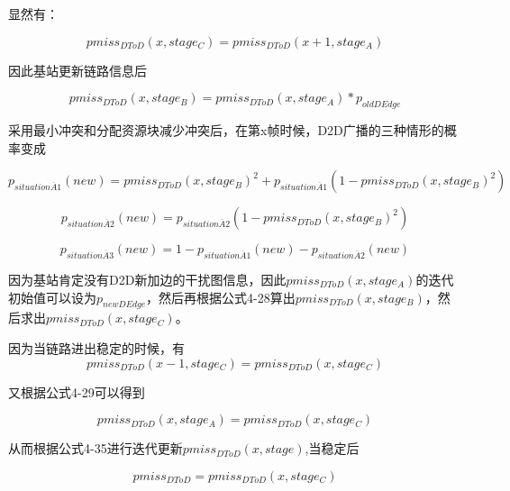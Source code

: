 \documentclass[figurelist,tablelist,algorithmlist,nomlist,masters]{seuthesix}
\begin{document}
	显然有：
	
	\begin{equation}\label{eq3.1}
	pmis{s_{DToD}}(x,stag{e_C}) = pmis{s_{DToD}}(x + 1,stag{e_A})
	\end{equation}
	
	因此基站更新链路信息后
	
	\begin{equation}\label{eq3.2}
	pmis{s_{DToD}}(x,stag{e_B}) = pmis{s_{DToD}}(x,stag{e_A})*{p_{oldDEdge}}
	\end{equation}
	
	采用最小冲突和分配资源块减少冲突后，在第x帧时候，D2D广播的三种情形的概率变成
	
	\begin{equation}\label{eq3.1}
	{p_{situation\overline A 1}}(new) = pmis{s_{DToD}}{(x,stag{e_B})^2} + {p_{situation\overline A 1}}(1 - pmis{s_{DToD}}{(x,stag{e_B})^2})
	\end{equation}
	
	\begin{equation}\label{eq3.1}
	{p_{situation\overline A 2}}(new) = {p_{situation\overline A 2}}(1 - pmis{s_{DToD}}{(x,stag{e_B})^2})
	\end{equation}
	
	\begin{equation}\label{eq3.1}
	{p_{situation\overline A 3}}(new) = 1 - {p_{situation\overline A 1}}(new) - {p_{situation\overline A 2}}(new)
	\end{equation}
	
	因为基站肯定没有D2D新加边的干扰图信息，因此$pmis{s_{DToD}}(x,stag{e_A})$的迭代初始值可以设为${p_{newDEdge}}$，然后再根据公式4-28算出$pmis{s_{DToD}}(x,stag{e_B})$，然后求出$pmis{s_{DToD}}(x,stag{e_C})$。
	
	因为当链路进出稳定的时候，有
	\begin{equation}\label{eq3.1}
	pmis{s_{DToD}}(x - 1,stag{e_C}) = pmis{s_{DToD}}(x,stag{e_C})
	\end{equation}
	
	又根据公式4-29可以得到
	
	\begin{equation}\label{eq3.1}
	pmis{s_{DToD}}(x,stag{e_A}) = pmis{s_{DToD}}(x,stag{e_C})
	\end{equation}
	
	从而根据公式4-35进行迭代更新$pmis{s_{DToD}}(x,stage)$,当稳定后
	
	\begin{equation}\label{eq3.1}
	pmis{s_{DToD}} = pmis{s_{DToD}}(x,stag{e_C})
	\end{equation}
	
\end{document}
